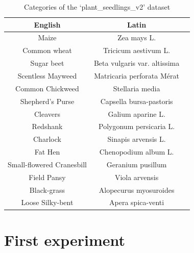 \begin{table}[ht]
\centering
\begin{tabular}{|c|c|c|}
\hline
    English & Latin \\
\hline
    Maize & Zea mays L.\\
    Common wheat & Tricicum aestivum L.\\
    Sugar beet & Beta vulgaris var. altissima\\
    Scentless Mayweed & Matricaria perforata Mérat\\
    Common Chickweed & Stellaria media\\
    Shepherd’s Purse & Capsella bursa-pastoris\\
    Cleavers& Galium aparine L.\\
    Redshank& Polygonum persicaria L.\\
    Charlock& Sinapis arvensis L.\\
    Fat Hen& Chenopodium album L.\\
    Small-flowered Cranesbill & Geranium pusillum\\
    Field Pansy& Viola arvensis\\
    Black-grass& Alopecurus myosuroides\\
    Loose Silky-bent& Apera spica-venti\\
    \hline
\end{tabular}
\caption[Categories of the ‘plant\_seedlings\_v2’ dataset]{Categories of the ‘plant\_seedlings\_v2’ dataset \cite{giselsson2017public} }
\label{tab:dataset_species}
\end{table}


\section{First experiment}


